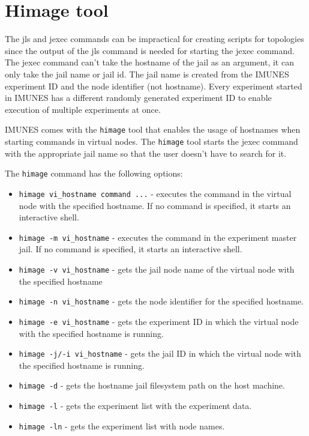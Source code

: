 \section{Himage tool}
The jls and jexec commands can be impractical for creating scripts for
topologies since the output of the jls command is needed for starting the jexec
command. The jexec command can't take the hostname of the jail as an argument,
it can only take the jail name or jail id. The jail name is created from the
IMUNES experiment ID and the node identifier (not hostname). Every experiment
started in IMUNES has a different randomly generated experiment ID to enable
execution of multiple experiments at once.

IMUNES comes with the \texttt{himage} tool that enables the usage of hostnames
when starting commands in virtual nodes. The \texttt{himage} tool starts the
jexec command with the appropriate jail name so that the user doesn't have to
search for it. 

The \texttt{himage} command has the following options:
\begin{itemize}
\item \texttt{himage vi\_hostname command ...} - executes the command in the virtual
node with the specified hostname. If no command is specified, it starts an
interactive shell.
\item \texttt{himage -m vi\_hostname} - executes the command in the experiment
master jail. If no command is specified, it starts an interactive shell.
\item \texttt{himage -v vi\_hostname} - gets the jail node name of the virtual
node with the specified hostname
\item \texttt{himage -n vi\_hostname} - gets the node identifier for the
specified hostname.
\item \texttt{himage -e vi\_hostname} - gets the experiment ID in which the virtual
node with the specified hostname is running.
\item \texttt{himage -j/-i vi\_hostname} - gets the jail ID in which the virtual
node with the specified hostname is running.
\item \texttt{himage -d} - gets the hostname jail filesystem path on the host
machine.
\item \texttt{himage -l} - gets the experiment list with the experiment data.
\item \texttt{himage -ln} - gets the experiment list with node names.
\end{itemize}

